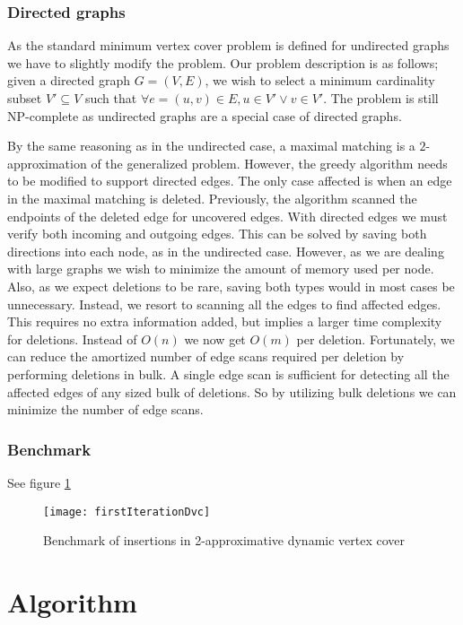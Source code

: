  
\subsubsection{Directed graphs}
As the standard minimum vertex cover problem is defined for undirected graphs we have to slightly modify the problem. Our problem description is as follows; given a directed graph $G = (V,E)$, we wish to select a minimum cardinality subset $V' \subseteq V$ such that $\forall e = (u,v) \in E, u \in V' \vee v \in V'$. The problem is still NP-complete as undirected graphs are a special case of directed graphs. 

By the same reasoning as in the undirected case, a maximal matching is a $2$-approximation of the generalized problem. However, the greedy algorithm needs to be modified to support directed edges. The only case affected is when an edge in the maximal matching is deleted. Previously, the algorithm scanned the endpoints of the deleted edge for uncovered edges. With directed edges we must verify both incoming and outgoing edges. This can be solved by saving both directions into each node, as in the undirected case. However, as we are dealing with large graphs we wish to minimize the amount of memory used per node. Also, as we expect deletions to be rare, saving both types would in most cases be unnecessary. Instead, we resort to scanning all the edges to find affected edges. This requires no extra information added, but implies a larger time complexity for deletions. Instead of $O(n)$ we now get $O(m)$ per deletion. Fortunately, we can reduce the amortized number of edge scans required per deletion by performing deletions in bulk. A single edge scan is sufficient for detecting all the affected edges of any sized bulk of deletions. So by utilizing bulk deletions we can minimize the number of edge scans.

\subsubsection{Benchmark}
See figure \ref{fig:firstIterationDvc} 

\begin{figure}[h]
\centering
\texttt{[image: firstIterationDvc]}    
\captionsetup{justification=centering}
\caption {Benchmark of insertions in 2-approximative dynamic vertex cover}
\label{fig:firstIterationDvc}
\end{figure}


\section{Algorithm}

